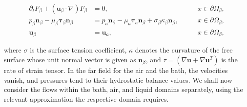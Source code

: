 \begin{align}\label{eq: KBC General}
    \partial_t F_\beta + (\mathbf{u}_\beta \cdot \nabla)F_\beta &= 0, \qquad &x\in \partial\Omega_\beta,\\
    p_\beta \mathbf{n}_\beta - \mu_\beta \mathbf{\tau}_\beta \mathbf{n}_\beta &= p_a \mathbf{n}_\beta - \mu_a \mathbf{\tau}_a  \mathbf{n}_\beta + \sigma_\beta \kappa_\beta \mathbf{n}_\beta, \qquad & x\in \partial\Omega_\beta,\label{eq:StressCont} \\
    \mathbf{u}_\beta &=  \mathbf{u}_a,  \qquad & x\in \partial\Omega_\beta,\label{eq:VelocityCont}
   \end{align}
   
where $\sigma$ is the surface tension coefficient, $\kappa$ denotes the curvature of the free surface whose unit normal vector is given as $\mathbf{n}_\beta$, and  $\tau = (\nabla \mathbf{u} + \nabla \mathbf{u}^T)$ is the rate of strain tensor. In the far field for the air and the bath, the velocities vanish, and pressures tend to their hydrostatic balance values. 
We shall now consider the flows within the bath, air, and liquid domains separately, using the relevant approximation the respective domain requires.
   




